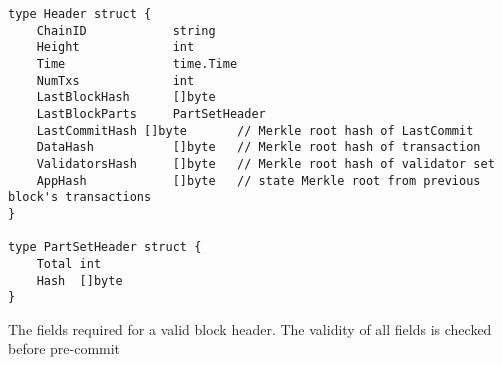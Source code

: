
\begin{verbatim}
type Header struct {
	ChainID            string        
	Height             int           
	Time               time.Time     
	NumTxs             int           
	LastBlockHash      []byte        
	LastBlockParts     PartSetHeader 
	LastCommitHash []byte       // Merkle root hash of LastCommit
	DataHash           []byte   // Merkle root hash of transaction 
	ValidatorsHash     []byte   // Merkle root hash of validator set
	AppHash            []byte   // state Merkle root from previous block's transactions
}

type PartSetHeader struct {
	Total int    
	Hash  []byte 
}
\end{verbatim}
	\caption[Block Header Structure]{The fields required for a valid block header. The validity of all fields is checked before pre-commit}
